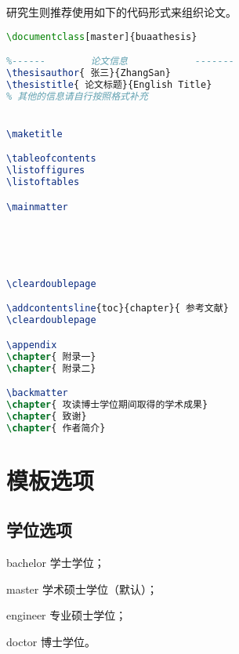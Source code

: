 \qquad 研究生则推荐使用如下的代码形式来组织论文。\par
\begin{lstlisting}[language={LaTeX}]
\documentclass[master]{buaathesis}

%------        论文信息            -------
\thesisauthor{ 张三}{ZhangSan}
\thesistitle{ 论文标题}{English Title}
% 其他的信息请自行按照格式补充


\maketitle

\tableofcontents
\listoffigures
\listoftables

\mainmatter





\cleardoublepage

\addcontentsline{toc}{chapter}{ 参考文献}
\cleardoublepage

\appendix
\chapter{ 附录一}
\chapter{ 附录二}

\backmatter
\chapter{ 攻读博士学位期间取得的学术成果}
\chapter{ 致谢}
\chapter{ 作者简介}


\end{lstlisting}
	
	\section{模板选项}
		\subsection{学位选项}
		\begin{description}
			\item{bachelor} 学士学位；
			\item{master} 学术硕士学位（默认）；
			\item{engineer} 专业硕士学位；
			\item{doctor} 博士学位。
		\end{description}

